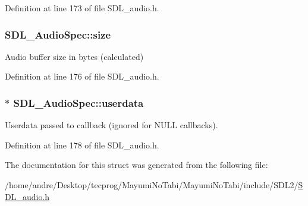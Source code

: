 Definition at line 173 of file S\-D\-L\-\_\-audio.\-h.

\hypertarget{struct_s_d_l___audio_spec_a154cf44743ecec78c36dc6c827dd2fdb}{
\subsubsection[{size}]{ S\-D\-L\-\_\-\-Audio\-Spec\-::size}}\label{struct_s_d_l___audio_spec_a154cf44743ecec78c36dc6c827dd2fdb}
Audio buffer size in bytes (calculated) 

Definition at line 176 of file S\-D\-L\-\_\-audio.\-h.

\hypertarget{struct_s_d_l___audio_spec_aeec9481666f5f0982c98d3878f175d9b}{
\subsubsection[{userdata}]{$\ast$ S\-D\-L\-\_\-\-Audio\-Spec\-::userdata}}\label{struct_s_d_l___audio_spec_aeec9481666f5f0982c98d3878f175d9b}
Userdata passed to callback (ignored for N\-U\-L\-L callbacks). 

Definition at line 178 of file S\-D\-L\-\_\-audio.\-h.



The documentation for this struct was generated from the following file\-:\begin{DoxyCompactItemize}
\item 
/home/andre/\-Desktop/tecprog/\-Mayumi\-No\-Tabi/\-Mayumi\-No\-Tabi/include/\-S\-D\-L2/\hyperlink{_s_d_l__audio_8h}{S\-D\-L\-\_\-audio.\-h}\end{DoxyCompactItemize}
